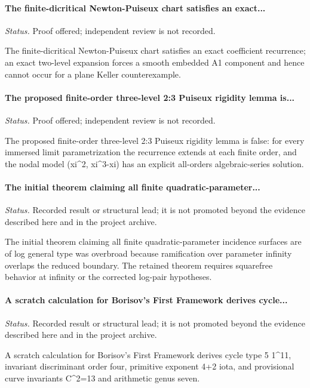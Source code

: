 \label{supp-note-06-003}
\paragraph{The finite-dicritical Newton-Puiseux chart satisfies an exact...}
\emph{Status.} Proof offered; independent review is not recorded.

The finite-dicritical Newton-Puiseux chart satisfies an exact coefficient recurrence; an exact two-level expansion forces a smooth embedded A1 component and hence cannot occur for a plane Keller counterexample.

\label{supp-note-06-004}
\paragraph{The proposed finite-order three-level 2:3 Puiseux rigidity lemma is...}
\emph{Status.} Proof offered; independent review is not recorded.

The proposed finite-order three-level 2:3 Puiseux rigidity lemma is false: for every immersed limit parametrization the recurrence extends at each finite order, and the nodal model (xi\textasciicircum{}2, xi\textasciicircum{}3-xi) has an explicit all-orders algebraic-series solution.

\label{supp-note-06-005}
\paragraph{The initial theorem claiming all finite quadratic-parameter...}
\emph{Status.} Recorded result or structural lead; it is not promoted beyond the evidence described here and in the project archive.

The initial theorem claiming all finite quadratic-parameter incidence surfaces are of log general type was overbroad because ramification over parameter infinity overlaps the reduced boundary. The retained theorem requires squarefree behavior at infinity or the corrected log-pair hypotheses.

\label{supp-note-06-006}
\paragraph{A scratch calculation for Borisov's First Framework derives cycle...}
\emph{Status.} Recorded result or structural lead; it is not promoted beyond the evidence described here and in the project archive.

A scratch calculation for Borisov's First Framework derives cycle type 5 1\textasciicircum{}11, invariant discriminant order four, primitive exponent 4+2 iota, and provisional curve invariants C\textasciicircum{}2=13 and arithmetic genus seven.

